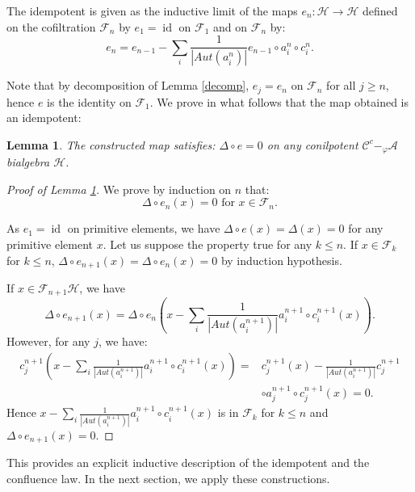 \documentclass[11pt,leqno]{amsart}
\theoremstyle{definition}
\theoremstyle{plain}
\newtheorem{lemma}[definition]{Lemma}
\newcommand{\Hc}{ \mathcal{H} }
\newcommand{\A}{ \mathcal{A} }
\newcommand{\C}{ \mathcal{C} }
\newcommand{\F}{ \mathcal{F} }
\begin{document}
The idempotent is given as the inductive limit of the maps $e_n: \mathcal{H} \rightarrow \mathcal{H}$ defined on the cofiltration $\F_n$ by $e_1=\operatorname{id}$ on $\F_1$ and on $\F_n$ by:
\begin{equation*}
e_{n} = e_{n-1}-\sum_{i} \frac{1}{|Aut(a^n_i)|} e_{n-1} \circ a^n_i \circ c_i^n.
\end{equation*}

Note that by decomposition of Lemma \ref{decomp}, $e_j=e_n$ on $\F_n$ for all $j \geq n$, hence $e$ is the identity on $\F_1$. We prove in what follows that the map obtained is an idempotent:

\begin{lemma} \label{De}
The constructed map satisfies:
$\Delta \circ e = 0$ on any conilpotent $\C^c-_{\varphi} \A$ bialgebra $\Hc$.
\end{lemma}

\begin{proof}[Proof of Lemma \ref{De}]
We prove by induction on $n$ that: 
\begin{equation*}
\Delta \circ e_n(x) = 0 \text{ for } x \in \F_n.
\end{equation*}

As $e_1 = \operatorname{id}$ on primitive elements, we have $\Delta \circ e (x) = \Delta (x) = 0$ for any primitive element $x$.
Let us suppose the property true for any $k \leq n$.
If $x \in \F_k$ for $k \leq n$, $\Delta \circ e_{n+1}(x)=\Delta \circ e_{n}(x)=0$ by induction hypothesis.

If $x \in \F_{n+1}\Hc$, we have
\begin{equation*}
\Delta \circ e_{n+1}(x) = \Delta \circ e_n \left( x - \sum_i \frac{1}{|Aut(a^{n+1}_i)|} a^{n+1}_i \circ c_i^{n+1} (x) \right).
\end{equation*}
However, for any $j$, we have:
\begin{equation*}
\begin{split}
c_j^{n+1} \left( x -\sum_i \frac{1}{|Aut(a^{n+1}_i)|} a^{n+1}_i \circ c_i^{n+1} (x) \right) =& c_j^{n+1}(x) - \frac{1}{|Aut(a^{n+1}_i)|} c_j^{n+1} \\ & \circ a_j^{n+1} \circ c_j^{n+1} (x) = 0.
\end{split}
\end{equation*}
Hence $x - \sum_i \frac{1}{|Aut(a^{n+1}_i)|} a^{n+1}_i \circ c_i^{n+1} (x)$ is in $\F_k$ for $k \leq n$ and $\Delta \circ e_{n+1}(x)=0$.
\end{proof}

This provides an explicit inductive description of the idempotent and the confluence law. In the next section, we apply these constructions.
\end{document}

